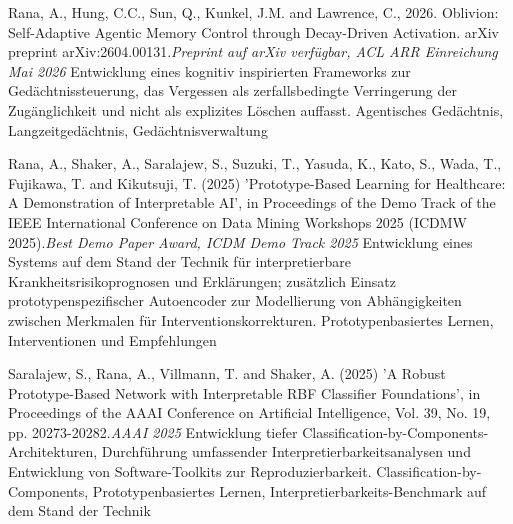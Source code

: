 
\begin{projects}
    \project
	{Rana, A., Hung, C.C., Sun, Q., Kunkel, J.M. and Lawrence, C., 2026. Oblivion: Self-Adaptive Agentic Memory Control through Decay-Driven Activation. arXiv preprint arXiv:2604.00131.}{\textit{Preprint auf arXiv verfügbar, ACL ARR Einreichung Mai 2026}}
	{
	}
	{Entwicklung eines kognitiv inspirierten Frameworks zur Gedächtnissteuerung, das Vergessen als zerfallsbedingte Verringerung der Zugänglichkeit und nicht als explizites Löschen auffasst.}
	{Agentisches Gedächtnis, Langzeitgedächtnis, Gedächtnisverwaltung}

    \project
	{Rana, A., Shaker, A., Saralajew, S., Suzuki, T., Yasuda, K., Kato, S., Wada, T., Fujikawa, T. and Kikutsuji, T. (2025) 'Prototype-Based Learning for Healthcare: A Demonstration of Interpretable AI', in Proceedings of the Demo Track of the IEEE International Conference on Data Mining Workshops 2025 (ICDMW 2025).}{\textit{Best Demo Paper Award, ICDM Demo Track 2025}}
	{
	}
	{Entwicklung eines Systems auf dem Stand der Technik für interpretierbare Krankheitsrisikoprognosen und Erklärungen; zusätzlich Einsatz prototypenspezifischer Autoencoder zur Modellierung von Abhängigkeiten zwischen Merkmalen für Interventionskorrekturen.}
	{Prototypenbasiertes Lernen, Interventionen und Empfehlungen}

	\project
	{Saralajew, S., Rana, A., Villmann, T. and Shaker, A. (2025) 'A Robust Prototype-Based Network with Interpretable RBF Classifier Foundations', in Proceedings of the AAAI Conference on Artificial Intelligence, Vol. 39, No. 19, pp. 20273-20282.}{\textit{AAAI 2025}}
	{
	}
	{Entwicklung tiefer Classification-by-Components-Architekturen, Durchführung umfassender Interpretierbarkeitsanalysen und Entwicklung von Software-Toolkits zur Reproduzierbarkeit.}
	{Classification-by-Components, Prototypenbasiertes Lernen, Interpretierbarkeits-Benchmark auf dem Stand der Technik}


\end{projects}
